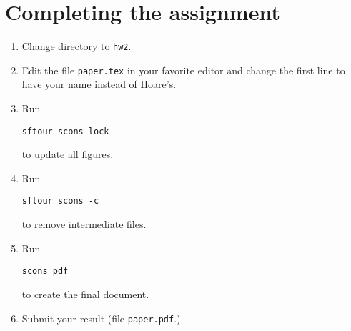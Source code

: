 \lstset{language=python,numbers=left,numberstyle=\tiny,showstringspaces=false}


\section{Completing the assignment}

\begin{enumerate}
\item Change directory to \texttt{hw2}.
\item Edit the file \texttt{paper.tex} in your favorite editor and change the
  first line to have your name instead of Hoare's.
\item Run
\begin{verbatim}
sftour scons lock
\end{verbatim}
to update all figures.
\item Run
\begin{verbatim}
sftour scons -c
\end{verbatim}
to remove intermediate files.
\item Run
\begin{verbatim}
scons pdf
\end{verbatim}
to create the final document.
\item Submit your result (file \texttt{paper.pdf}.)
\end{enumerate}
